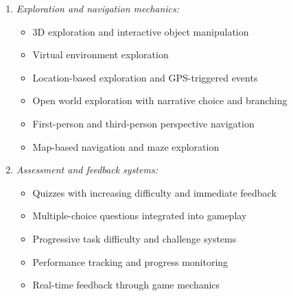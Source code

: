 \documentclass[a4paper,fleqn]{cas-sc}
\begin{document}
\begin{enumerate}[noitemsep]
	\item 
\textit{Exploration and navigation mechanics:}
\begin{itemize}[noitemsep]
 \item 3D exploration and interactive object manipulation \citep{1Barbatsis201159, 2Mahamarowi2023133, 10Huaman2019220, 39Tegos2014838, 73Wolfartsberger2011160}
 \item Virtual environment exploration \citep{5kazanidis2018alpha, 48Moketar2021, 63Liu2021}
 \item Location-based exploration and GPS-triggered events \citep{40Kuran2018, 49Huizenga2007127, 54Gibson2007, 59Kee2014270, 79Fernes2024379}
 \item Open world exploration with narrative choice and branching \citep{48Moketar2021}
 \item First-person and third-person perspective navigation \citep{2Mahamarowi2023133, 16Chen201447, 25Repantis2011502}
 \item Map-based navigation and maze exploration \citep{6Czerwinski2018, 60Hoy2018, 75trajano2014using}
\end{itemize}

	\item 
\textit{Assessment and feedback systems:}
\begin{itemize}[noitemsep]
 \item Quizzes with increasing difficulty and immediate feedback \citep{1Barbatsis201159, 4Cruz2017, 5kazanidis2018alpha, 13Humpire2022, 39Tegos2014838, 40Kuran2018, 52Lin2011265, 55Squire2004, 62Milosz201896, 63Liu2021, 73Wolfartsberger2011160, 77Ramansyah2021, 79Fernes2024379}
 \item Multiple-choice questions integrated into gameplay \citep{11Ternblad2023115, 24Ghannem2019, 77Ramansyah2021}
 \item Progressive task difficulty and challenge systems \citep{4Cruz2017, 11Ternblad2023115, 40Kuran2018, 62Milosz201896}
 \item Performance tracking and progress monitoring \citep{21Ghulamani2017, 62Milosz201896, 77Ramansyah2021}
 \item Real-time feedback through game mechanics \citep{1Barbatsis201159, 8Yu2014, 40Kuran2018, 52Lin2011265, 63Liu2021}
\end{itemize}


\end{enumerate}
\end{document}
